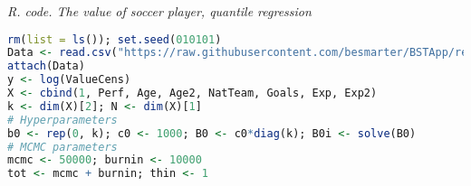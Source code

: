 \begin{tcolorbox}[enhanced,width=4.67in,center upper,
	fontupper=\large\bfseries,drop shadow southwest,sharp corners]
	\textit{R. code. The value of soccer player, quantile regression}
	\begin{VF}
		\begin{lstlisting}[language=R]
rm(list = ls()); set.seed(010101)
Data <- read.csv("https://raw.githubusercontent.com/besmarter/BSTApp/refs/heads/master/DataApp/1ValueFootballPlayers.csv", sep = ",", header = TRUE, quote = "")
attach(Data)
y <- log(ValueCens) 
X <- cbind(1, Perf, Age, Age2, NatTeam, Goals, Exp, Exp2)
k <- dim(X)[2]; N <- dim(X)[1]
# Hyperparameters
b0 <- rep(0, k); c0 <- 1000; B0 <- c0*diag(k); B0i <- solve(B0)
# MCMC parameters
mcmc <- 50000; burnin <- 10000
tot <- mcmc + burnin; thin <- 1
\end{lstlisting}
	\end{VF}
\end{tcolorbox} 

